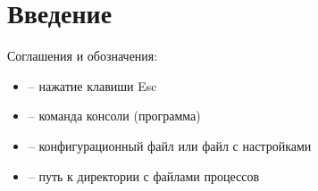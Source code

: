 \chapter{Введение}

Соглашения и обозначения:

\begin{itemize}
	\item {} -- нажатие клавиши Esc
	\item {} -- команда консоли (программа)
	\item {} -- конфигурационный файл или файл с настройками
	\item {} -- путь к директории с файлами процессов
\end{itemize}






